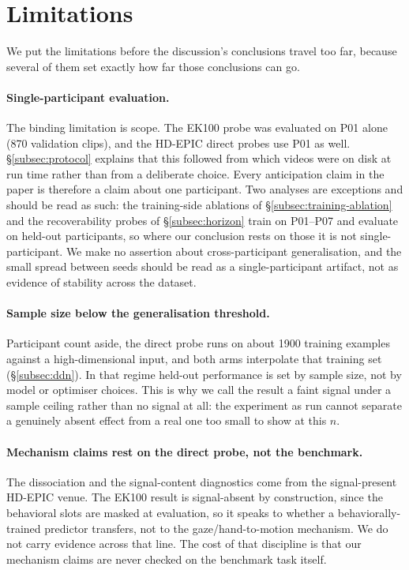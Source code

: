 \section{Limitations}

We put the limitations before the discussion's conclusions travel too far,
because several of them set exactly how far those conclusions can go.

\paragraph{Single-participant evaluation.}
The binding limitation is scope. The EK100 probe was evaluated on P01 alone
(\num{870} validation clips), and the HD-EPIC direct probes use P01 as well.
\S\ref{subsec:protocol} explains that this followed from which videos were on disk
at run time rather than from a deliberate choice. Every anticipation claim in the paper is therefore a claim about one
participant. Two analyses are exceptions and should be read as such: the
training-side ablations of \S\ref{subsec:training-ablation} and the
recoverability probes of \S\ref{subsec:horizon} train on P01--P07 and evaluate
on held-out participants, so where our conclusion rests on those it is not
single-participant. We make no assertion about
cross-participant generalisation, and the small spread between seeds should be
read as a single-participant artifact, not as evidence of stability across the
dataset.

\paragraph{Sample size below the generalisation threshold.}
Participant count aside, the direct probe runs on about \num{1900} training
examples against a high-dimensional input, and both arms interpolate that
training set (\S\ref{subsec:ddn}). In that regime held-out performance is set by
sample size, not by model or optimiser choices. This is why we call the result a
faint signal under a sample ceiling rather than no signal at all: the experiment
as run cannot separate a genuinely absent effect from a real one too small to
show at this $n$.

\paragraph{Mechanism claims rest on the direct probe, not the benchmark.}
The dissociation and the signal-content diagnostics come from the signal-present
HD-EPIC venue. The EK100 result is signal-absent by construction, since the
behavioral slots are masked at evaluation, so it speaks to whether a
behaviorally-trained predictor transfers, not to the gaze/hand-to-motion
mechanism. We do not carry evidence across that line. The cost of that discipline
is that our mechanism claims are never checked on the benchmark task itself.

